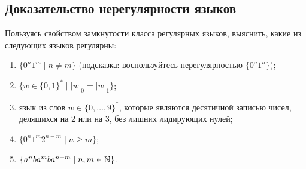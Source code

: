 \subsection*{Доказательство нерегулярности языков}
Пользуясь свойством замкнутости
класса регулярных языков, выяснить, какие из следующих языков регулярны:
\begin{enumerate}
  \item $\{0^n 1^m \mid n \neq m\}$ (подсказка: воспользуйтесь
  нерегулярностью $\{0^n1^n\}$);
  \item $\{ w \in \{0, 1\}^* \mid
  |w|_0 = |w|_1\}$;
  \item язык из слов $w \in \{0,\ldots, 9\}^*$, которые
  являются десятичной записью чисел, делящихся на 2 или на 3, без
  лишних лидирующих нулей;
  \item $\{ 0^n 1^m 2^{n-m} \mid n \geqslant m \}$;
  \item $\{ a^n b a^m b a^{n+m} \mid n, m \in \mathbb N \}$.
\end{enumerate}
%
